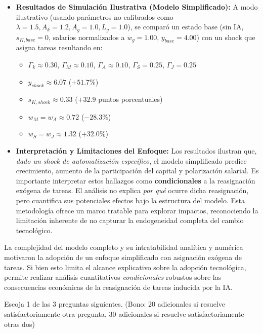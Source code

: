 \documentclass{article}
\theoremstyle{remark}
\theoremstyle{definition}
\begin{document}
\begin{enumerate}
\begin{tcolorbox}[title= Solución Punto 4 (Revisado y Justificado)]
\begin{itemize}
    \item \textbf{Resultados de Simulación Ilustrativa (Modelo Simplificado):}
        A modo ilustrativo (usando parámetros no calibrados como $\lambda=1.5, A_k=1.2, A_g=1.0, L_g=1.0$), se comparó un estado base (sin IA, $s_{K,base}=0$, salarios normalizados a $w_g=1.00$, $y_{base}=4.00$) con un shock que asigna tareas resultando en:
        \begin{itemize}
            \item $\Gamma_k \approx 0.30$, $\Gamma_M \approx 0.10$, $\Gamma_A \approx 0.10$, $\Gamma_S = 0.25$, $\Gamma_J = 0.25$
            \item $y_{shock} \approx 6.07$ ($+51.7\%$)
            \item $s_{K, shock} \approx 0.33$ ($+32.9$ puntos porcentuales)
            \item $w_M = w_A \approx 0.72$ ($-28.3\%$)
            \item $w_S = w_J \approx 1.32$ ($+32.0\%$)
        \end{itemize}

    \item \textbf{Interpretación y Limitaciones del Enfoque:} Los resultados ilustran que, \textit{dado un shock de automatización específico}, el modelo simplificado predice crecimiento, aumento de la participación del capital y polarización salarial. Es importante interpretar estos hallazgos como \textbf{condicionales} a la reasignación exógena de tareas. El análisis no explica \textit{por qué} ocurre dicha reasignación, pero cuantifica sus potenciales efectos bajo la estructura del modelo. Esta metodología ofrece un marco tratable para explorar impactos, reconociendo la limitación inherente de no capturar la endogeneidad completa del cambio tecnológico.

\end{itemize}

La complejidad del modelo completo y su intratabilidad analítica y numérica motivaron la adopción de un enfoque simplificado con asignación exógena de tareas. Si bien esto limita el alcance explicativo sobre la adopción tecnológica, permite realizar análisis cuantitativos \textit{condicionales} robustos sobre las consecuencias económicas de la reasignación de tareas inducida por la IA.

\end{tcolorbox}
\end{enumerate}    

Escoja 1 de las 3 preguntas siguientes. (Bono: 20 adicionales si resuelve satisfactoriamente otra pregunta, 30 adicionales si resuelve satisfactoriamente otras dos)
\end{document}
